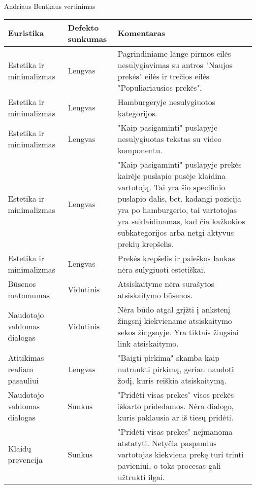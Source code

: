 \documentclass[oneside]{VUMIFPSkursinis}
\begin{document}
Andriaus Bentkaus vertinimas
\begin{center}
	\begin{tabular}{ |p{3cm}| p{3cm} | p{11cm} | }
		\hline
		Euristika                    & Defekto sunkumas & Komentaras \\ \hline
		Estetika ir minimalizmas     & Lengvas          &
			Pagrindiniame lange pirmos eilės nesulygiavimas su antros "Naujos prekės" eilės ir trečios eilės "Populiariausios prekės".
			\\ \hline
		Estetika ir minimalizmas     & Lengvas          &
			Hamburgeryje nesulygiuotos kategorijos.
			\\ \hline
		Estetika ir minimalizmas     & Lengvas          &
			"Kaip pasigaminti" puslapyje nesulygiuotas tekstas su video komponentu.
			\\ \hline
		Estetika ir minimalizmas     & Lengvas          &
			"Kaip pasigaminti" puslapyje prekės kairėje puslapio pusėje klaidina vartotoją.
			Tai yra šio specifinio puslapio dalis, bet, kadangi pozicija yra po hamburgerio, tai vartotojas yra suklaidinamas, kad čia kažkokios subkategorijos arba netgi aktyvus prekių krepšelis.
			\\ \hline
		Estetika ir minimalizmas     & Lengvas          &
			Prekės krepšelis ir paieškos laukas nėra sulygiuoti estetiškai.
			\\ \hline
		Būsenos matomumas            & Vidutinis        &
			Atsiskaityme nėra surašytos atsiskaitymo būsenos.
			\\ \hline
		Naudotojo valdomas dialogas  & Vidutinis         &
			Nėra būdo atgal grįžti į ankstenį žingsnį kiekviename atsiskaitymo sekos žingsnyje.
			Yra tiktais žingsiai link atsiskaitymo.
			\\ \hline
		Atitikimas realiam pasauliui & Lengvas          &
			"Baigti pirkimą" skamba kaip nutraukti pirkimą, geriau naudoti žodį, kuris reiškia atsiskaitymą.
			\\ \hline
		Naudotojo valdomas dialogas  & Sunkus           &
			"Pridėti visas prekes" visos prekės iškarto pridedamos.
			Nėra dialogo, kuris paklausia ar iš tiesų pridėti.
			\\ \hline
		Klaidų prevencija            & Sunkus           &
			"Pridėti visas prekes" neįmanoma atstatyti.
			Netyčia paspaudus vartotojas kiekviena prekę turi trinti pavieniui, o toks procesas gali užtrukti ilgai.
			\\ \hline
	\end{tabular}
\end{center}
\end{document}
